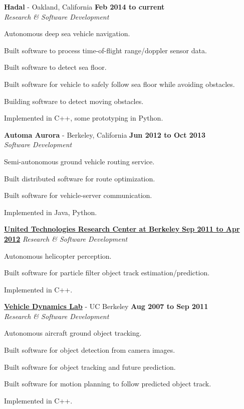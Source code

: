 \textbf{Hadal} - Oakland, California \hfill \textbf{Feb 2014 to current}\\
\textit{Research \& Software Development}
\begin{innerlist}
  \item Autonomous deep sea vehicle navigation.
  \item Built software to process time-of-flight range/doppler sensor data.
  \item Built software to detect sea floor.
  \item Built software for vehicle to safely follow sea floor while avoiding obstacles.
  \item Building software to detect moving obstacles.
  \item Implemented in C++, some prototyping in Python.
\end{innerlist}

\halfblankline

\textbf{Automa Aurora} - Berkeley, California \hfill \textbf{Jun 2012 to Oct 2013}\\
\textit{Software Development}
\begin{innerlist}
  \item Semi-autonomous ground vehicle routing service.
  \item Built distributed software for route optimization.
  \item Built software for vehicle-server communication.
  \item Implemented in Java, Python.
\end{innerlist}

\halfblankline

\href{http://www.utrc.utc.com/}{\textbf{United Technologies Research Center at Berkeley} \hfill \textbf{Sep 2011 to Apr 2012}}
\textit{Research \& Software Development}
\begin{innerlist}
  \item Autonomous helicopter perception.
  \item Built software for particle filter object track estimation/prediction.
  \item Implemented in C++.
\end{innerlist}

\halfblankline

\href{http://vehicle.me.berkeley.edu/}{\textbf{Vehicle Dynamics Lab}} - UC Berkeley \hfill \textbf{Aug 2007 to Sep 2011}\\
\textit{Research \& Software Development}
\begin{innerlist}
  \item Autonomous aircraft ground object tracking.
  \item Built software for object detection from camera images.
  \item Built software for object tracking and future prediction.
  \item Built software for motion planning to follow predicted object track.
  \item Implemented in C++.
\end{innerlist}

